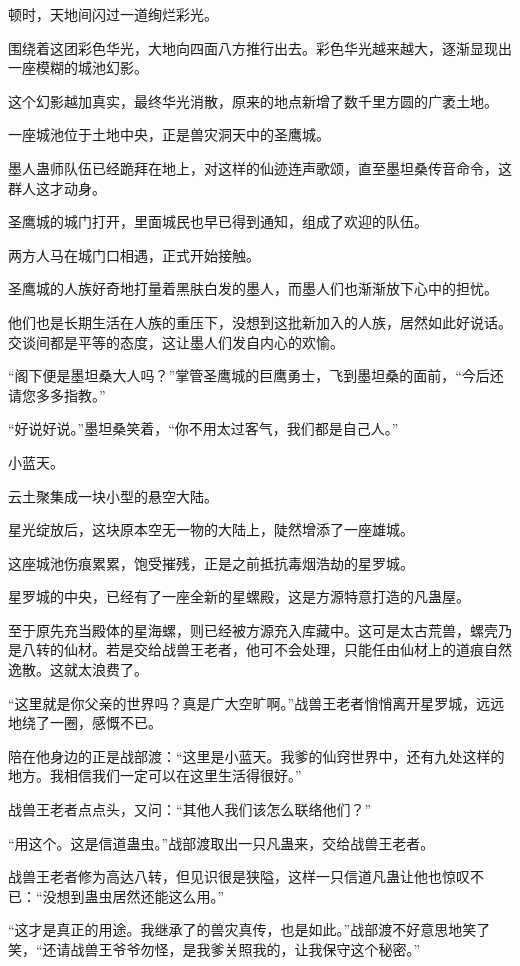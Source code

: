 \begin{this_body}
顿时，天地间闪过一道绚烂彩光。

围绕着这团彩色华光，大地向四面八方推行出去。彩色华光越来越大，逐渐显现出一座模糊的城池幻影。

这个幻影越加真实，最终华光消散，原来的地点新增了数千里方圆的广袤土地。

一座城池位于土地中央，正是兽灾洞天中的圣鹰城。

墨人蛊师队伍已经跪拜在地上，对这样的仙迹连声歌颂，直至墨坦桑传音命令，这群人这才动身。

圣鹰城的城门打开，里面城民也早已得到通知，组成了欢迎的队伍。

两方人马在城门口相遇，正式开始接触。

圣鹰城的人族好奇地打量着黑肤白发的墨人，而墨人们也渐渐放下心中的担忧。

他们也是长期生活在人族的重压下，没想到这批新加入的人族，居然如此好说话。交谈间都是平等的态度，这让墨人们发自内心的欢愉。

“阁下便是墨坦桑大人吗？”掌管圣鹰城的巨鹰勇士，飞到墨坦桑的面前，“今后还请您多多指教。”

“好说好说。”墨坦桑笑着，“你不用太过客气，我们都是自己人。”

小蓝天。

云土聚集成一块小型的悬空大陆。

星光绽放后，这块原本空无一物的大陆上，陡然增添了一座雄城。

这座城池伤痕累累，饱受摧残，正是之前抵抗毒烟浩劫的星罗城。

星罗城的中央，已经有了一座全新的星螺殿，这是方源特意打造的凡蛊屋。

至于原先充当殿体的星海螺，则已经被方源充入库藏中。这可是太古荒兽，螺壳乃是八转的仙材。若是交给战兽王老者，他可不会处理，只能任由仙材上的道痕自然逸散。这就太浪费了。

“这里就是你父亲的世界吗？真是广大空旷啊。”战兽王老者悄悄离开星罗城，远远地绕了一圈，感慨不已。

陪在他身边的正是战部渡：“这里是小蓝天。我爹的仙窍世界中，还有九处这样的地方。我相信我们一定可以在这里生活得很好。”

战兽王老者点点头，又问：“其他人我们该怎么联络他们？”

“用这个。这是信道蛊虫。”战部渡取出一只凡蛊来，交给战兽王老者。

战兽王老者修为高达八转，但见识很是狭隘，这样一只信道凡蛊让他也惊叹不已：“没想到蛊虫居然还能这么用。”

“这才是真正的用途。我继承了的兽灾真传，也是如此。”战部渡不好意思地笑了笑，“还请战兽王爷爷勿怪，是我爹关照我的，让我保守这个秘密。”


\end{this_body}
